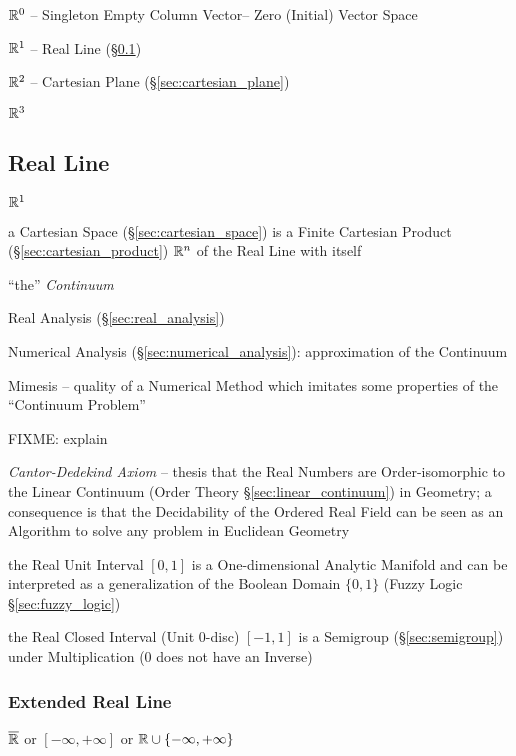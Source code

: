 $\mathbb{R}^0$ -- Singleton Empty Column Vector-- Zero (Initial) Vector
Space

$\mathbb{R}^1$ -- Real Line (\S\ref{sec:real_line})

$\mathbb{R}^2$ -- Cartesian Plane (\S\ref{sec:cartesian_plane})

$\mathbb{R}^3$



\subsection{Real Line}\label{sec:real_line}

$\mathbb{R}^1$

a Cartesian Space (\S\ref{sec:cartesian_space}) is a Finite Cartesian Product
(\S\ref{sec:cartesian_product}) $\mathbb{R}^n$ of the Real Line with itself

``the'' \emph{Continuum}

\fist Real Analysis (\S\ref{sec:real_analysis})

\fist Numerical Analysis (\S\ref{sec:numerical_analysis}): approximation of the
Continuum

Mimesis -- quality of a Numerical Method which imitates some properties of the
``Continuum Problem''

FIXME: explain

\emph{Cantor-Dedekind Axiom} -- thesis that the Real Numbers are
Order-isomorphic to the Linear Continuum (Order Theory
\S\ref{sec:linear_continuum}) in Geometry; a consequence is that the
Decidability of the Ordered Real Field can be seen as an Algorithm to solve any
problem in Euclidean Geometry

the Real Unit Interval $[0,1]$ is a One-dimensional Analytic Manifold and can be
interpreted as a generalization of the Boolean Domain $\{0, 1\}$ (Fuzzy Logic
\S\ref{sec:fuzzy_logic})

the Real Closed Interval (Unit 0-disc) $[-1,1]$ is a Semigroup
(\S\ref{sec:semigroup}) under Multiplication ($0$ does not have an Inverse)



\subsubsection{Extended Real Line}\label{sec:extended_real_line}

$\overline{\mathbb{R}}$ or $[-\infty, +\infty]$ or $\mathbb{R} \cup \{
-\infty, +\infty\}$

